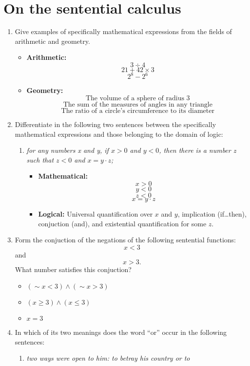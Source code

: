 \section{On the sentential calculus}
\begin{enumerate}
\item Give examples of specifically mathematical expressions from the
  fields of arithmetic and geometry.
  \begin{itemize}
  \item \textbf{Arithmetic:}
    $$3 \div 4$$
    $$21 + 42 \times 3$$
    $$2^8 - 2^6$$
  \item \textbf{Geometry:}
    $$\text{The volume of a sphere of radius 3}$$
    $$\text{The sum of the measures of angles in any triangle}$$
    $$\text{The ratio of a circle's circumference to its diameter}$$
  \end{itemize}
\item Differentiate in the following two sentences between the
  specifically mathematical expressions and those belonging to the
  domain of logic:
  \begin{enumerate}
    \item \emph{for any numbers x and y, if $x>0$ and $y<0$, then
      there is a number z such that $z<0$ and $x=y \cdot z$;}
      \begin{itemize}
      \item \textbf{Mathematical:} $$x>0$$ $$y<0$$ $$z<0$$ $$x=y \cdot
        z$$
      \item \textbf{Logical:} Universal quantification over $x$ and
        $y$, implication (if{\ldots}then), conjuction (and), and
        existential quantification for some $z$.
      \end{itemize}
  \end{enumerate}
\item Form the conjuction of the negations of the following sentential
  functions:
  $$x<3$$
  and
  $$x>3.$$
  What number satisfies this conjuction?
  \begin{itemize}
  \item $(\sim x<3) \wedge (\sim x>3)$
  \item $(x \ge 3) \wedge (x \le 3)$
  \item $x = 3$
  \end{itemize}
\item In which of its two meanings does the word ``or'' occur in the
  following sentences:
  \begin{enumerate}
  \item \emph{two ways were open to him: to betray his country or to
}
\end{enumerate}
\end{enumerate}
